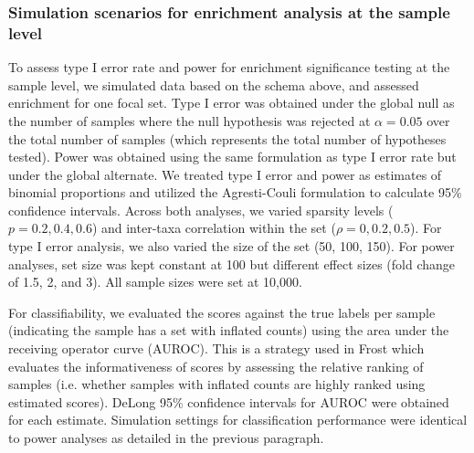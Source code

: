 \documentclass{article}
\begin{document}
\subsubsection{Simulation scenarios for enrichment analysis at the sample level}
To assess type I error rate and power for enrichment significance testing at the sample level, we simulated data based on the schema above, and assessed enrichment for one focal set. Type I error was obtained under the global null as the number of samples where the null hypothesis was rejected at $\alpha = 0.05$ over the total number of samples (which represents the total number of hypotheses tested). Power was obtained using the same formulation as type I error rate but under the global alternate. We treated type I error and power as estimates of binomial proportions and utilized the Agresti-Couli \cite{agresti1998} formulation to calculate 95\% confidence intervals. Across both analyses, we varied sparsity levels ($p = 0.2, 0.4, 0.6$) and inter-taxa correlation within the set ($\rho = 0, 0.2, 0.5$). For type I error analysis, we also varied the size of the set (50, 100, 150). For power analyses, set size was kept constant at 100 but different effect sizes (fold change of 1.5, 2, and 3). All sample sizes were set at 10,000. 

For classifiability, we evaluated the scores against the true labels per sample (indicating the sample has a set with inflated counts) using the area under the receiving operator curve (AUROC). This is a strategy used in Frost \cite{frost2020} which evaluates the informativeness of scores by assessing the relative ranking of samples (i.e. whether samples with inflated counts are highly ranked using estimated scores).  DeLong 95\% confidence intervals for AUROC \cite{delong1988} were obtained for each estimate. Simulation settings for classification performance were identical to power analyses as detailed in the previous paragraph. 
\end{document}
